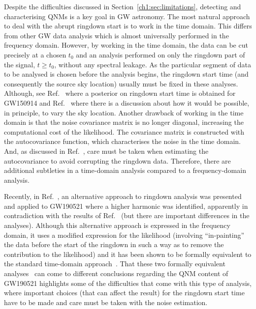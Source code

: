 Despite the difficulties discussed in Section~\ref{ch1:sec:limitations}, detecting and characterising QNMs is a key goal in GW astronomy. 
The most natural approach to deal with the abrupt ringdown start is to work in the time domain. 
This differs from other GW data analysis which is almost universally performed in the frequency domain. 
However, by working in the time domain, the data can be cut precisely at a chosen $t_0$ and an analysis performed on only the ringdown part of the signal, $t \geq t_0$, without any spectral leakage.
As the particular segment of data to be analysed is chosen before the analysis begins, the ringdown start time (and consequently the source sky location) usually must be fixed in these analyses. 
Although, see Ref.~\cite{Carullo:2019flw} where a posterior on ringdown start time is obtained for GW150914 and Ref.~\cite{Isi:2021iql} where there is a discussion about how it would be possible, in principle, to vary the sky location.
Another drawback of working in the time domain is that the noise covariance matrix is no longer diagonal, increasing the computational cost of the likelihood. 
The covariance matrix is constructed with the autocovariance function, which characterises the noise in the time domain.
And, as discussed in Ref.~\cite{Isi:2021iql}, care must be taken when estimating the autocovariance to avoid corrupting the ringdown data. Therefore, there are additional subtleties in a time-domain analysis compared to a frequency-domain analysis.

Recently, in Ref.~\cite{Capano:2021etf}, an alternative approach to ringdown analysis was presented and applied to GW190521 where a higher harmonic was identified, apparently in contradiction with the results of Ref.~\cite{LIGOScientific:2020tif} (but there are important differences in the analyses). 
Although this alternative approach is expressed in the frequency domain, it uses a modified expression for the likelihood (involving ``in-painting'' the data before the start of the ringdown in such a way as to remove the contribution to the likelihood) and it has been shown to be formally equivalent to the standard time-domain approach~\cite{Isi:2021iql}.
That these two formally equivalent analyses~\cite{LIGOScientific:2020tif, Capano:2021etf} can come to different conclusions regarding the QNM content of GW190521 highlights some of the difficulties that come with this type of analysis, where important choices (that can affect the result) for the ringdown start time have to be made and care must be taken with the noise estimation.

